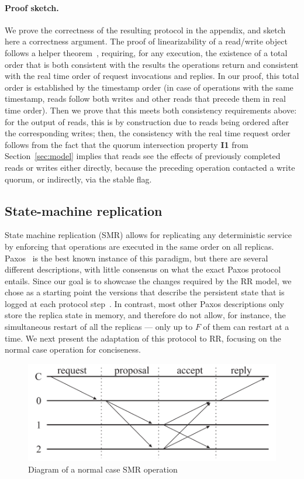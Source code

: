 \paragraph{Proof sketch.}
We prove the correctness of the resulting protocol in the
appendix, and sketch here a correctness argument. The proof of
linearizability of a read/write object follows a helper
theorem~\cite{nancy-book}, requiring, for any execution, the
existence of a total order that is both consistent with the
results the operations return and consistent with the real time
order of request invocations and replies. In our proof, this
total order is established by the timestamp order (in case of
operations with the same timestamp, reads follow both writes and
other reads that precede them in real time order).  Then we prove
that this meets both consistency requirements above: for the
output of reads, this is by construction due to reads being
ordered after the corresponding writes; then,
the consistency with the real time request order follows from the
fact that the quorum intersection property \textbf{I1} from
Section~\ref{sec:model} implies that reads see the effects of
previously completed reads or writes either directly, because the
preceding operation contacted a write quorum, or indirectly, via
the stable flag.


\subsection{State-machine replication}\label{ssec:paxos}

State machine replication (SMR) allows for replicating any
deterministic service by enforcing that operations are executed in the
same order on all replicas. Paxos~\cite{paxos} is the best known
instance of this paradigm, but there are several different
descriptions, with little consensus on what the exact Paxos protocol
entails.  Since our goal is to showcase the changes required by the
\ac{RR} model, we chose as a starting point the versions that
describe the persistent state that is logged at each protocol
step~\cite{paxos_builders,paxos_engineering}. In contrast, most other
Paxos descriptions only store the replica state in memory, and therefore
do not allow, for instance, the simultaneous restart of all the
replicas --- only up to $F$ of them can restart at a time. We next
present the adaptation of this protocol to \ac{RR}, focusing on
the normal case operation for conciseness.


\begin{figure}[t]
    \centering
    \includegraphics[width=.65\linewidth]{img/paxos}
    \caption{Diagram of a normal case SMR operation}\label{fig:paxos}
\end{figure}
